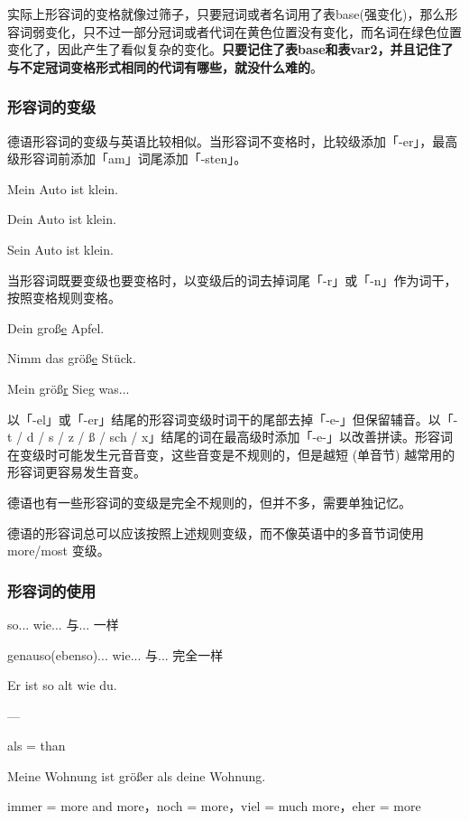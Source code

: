 实际上形容词的变格就像过筛子，只要冠词或者名词用了表base(强变化)，那么形容词弱变化，只不过一部分冠词或者代词在黄色位置没有变化，而名词在绿色位置变化了，因此产生了看似复杂的变化。{\bf 只要记住了表base和表var2，并且记住了与不定冠词变格形式相同的代词有哪些，就没什么难的}。

\subsubsection{形容词的变级}

德语形容词的变级与英语比较相似。当形容词不变格时，比较级添加「-er」，最高级形容词前添加「am」词尾添加「-sten」。

Mein Auto ist klein.

Dein Auto ist klein.

Sein Auto ist  klein.

当形容词既要变级也要变格时，以变级后的词去掉词尾「-r」或「-n」作为词干，按照变格规则变格。

Dein groß\uline{e} Apfel.

Nimm das größ\uline{e} Stück.

Mein größ\uline{r} Sieg was...

以「-el」或「-er」结尾的形容词变级时词干的尾部去掉「-e-」但保留辅音。以「-t / d / s / z / ß / sch / x」结尾的词在最高级时添加「-e-」以改善拼读。形容词在变级时可能发生元音音变，这些音变是不规则的，但是越短 (单音节) 越常用的形容词更容易发生音变。

德语也有一些形容词的变级是完全不规则的，但并不多，需要单独记忆。

德语的形容词总可以应该按照上述规则变级，而不像英语中的多音节词使用 more/most 变级。

\subsubsection{形容词的使用}

so... wie... 与... 一样

genauso(ebenso)... wie... 与... 完全一样

Er ist so alt wie du.

---

als = than

Meine Wohnung ist größer als deine Wohnung.

immer = more and more，noch = more，viel = much more，eher = more


